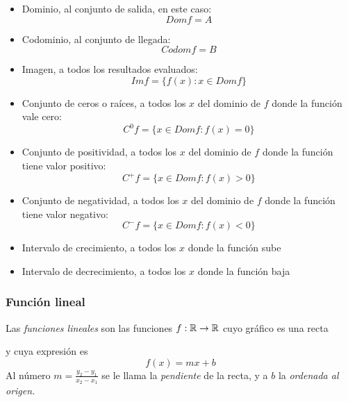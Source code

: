 \documentclass[../Teoría.root.tex]{subfiles}
\begin{document}
\begin{itemize}
    \item Dominio, al conjunto de salida, en este caso:
          \[Dom f=A\]
    \item Codominio, al conjunto de llegada:
          \[Codom f=B\]
    \item Imagen, a todos los resultados evaluados:
          \[Im f=\{f(x):x \in Dom f\}\]
    \item Conjunto de ceros o raíces, a todos los \(x\) del dominio de \(f\) donde la función vale cero:
          \[C^0 f=\{x\in Dom f:f(x)=0\}\]
    \item Conjunto de positividad, a todos los \(x\) del dominio de \(f\) donde la función tiene valor positivo:
          \[C^+ f=\{x\in Dom f:f(x) > 0\}\]
    \item Conjunto de negatividad, a todos los \(x\) del dominio de \(f\) donde la función tiene valor negativo:
          \[C^- f=\{x\in Dom f:f(x) < 0\}\]
    \item Intervalo de crecimiento, a todos los \(x\) donde la función sube
    \item Intervalo de decrecimiento, a todos los \(x\) donde la función baja
\end{itemize}
\subsubsection{Función lineal}
Las \textit{funciones lineales} son las funciones \(f: \mathbb{R} \rightarrow \mathbb{R}\) cuyo gráfico es una recta
\begin{center}
\end{center}
y cuya expresión es \[f(x)=mx+b\] Al número \(m = \frac{y_2-y_1}{x_2-x_1}\) se le llama la \textit{pendiente} de la recta, y a \(b\) la \textit{ordenada al origen.}
\end{document}
